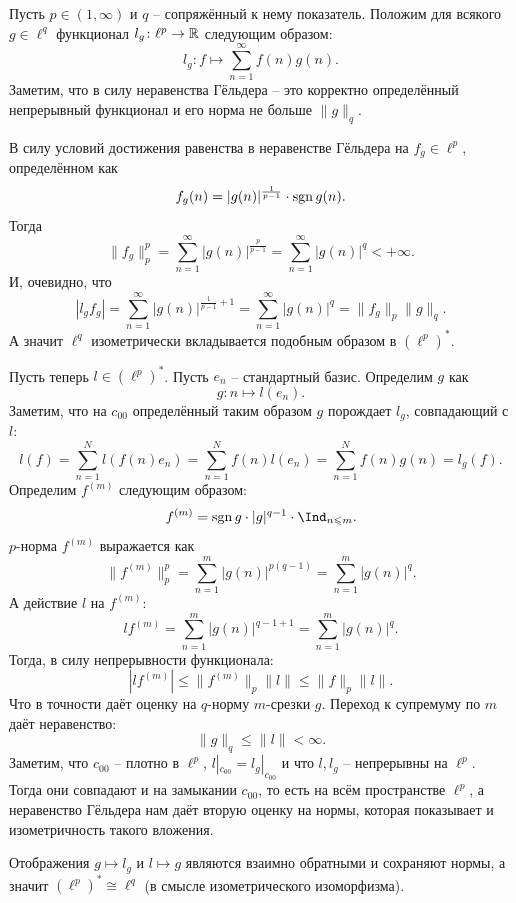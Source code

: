 \begin{solution}
    Пусть $p \in (1, \infty)$ и $q$ -- сопряжённый к нему показатель.
    Положим для всякого $g \in \ell^q$ функционал $l_g\colon \ell^p \to \mathbb{R}$ следующим образом:
    \[
        l_g\colon f \mapsto \sum_{n = 1}^{\infty} f(n)g(n).
    \]
    Заметим, что в силу неравенства Гёльдера -- это корректно определённый непрерывный функционал и его норма не больше $\|g\|_q$.

    В силу условий достижения равенства в неравенстве Гёльдера на $f_g \in \ell^p$, определённом как
    \[
        f_g(n) = |g(n)|^{\frac{1}{p - 1}} \cdot \operatorname{sgn} g(n).
    \]
    Тогда
    \[
        \|f_g\|_p^p = \sum_{n = 1}^{\infty} |g(n)|^{\frac{p}{p - 1}} = \sum_{n = 1}^{\infty} |g(n)|^{q} < +\infty.
    \]
    И, очевидно, что
    \[
        |l_g f_g| = \sum_{n = 1}^{\infty} |g(n)|^{\frac{1}{p - 1} + 1} = \sum_{n = 1}^{\infty} |g(n)|^{q} = \|f_g\|_p \|g\|_q.
    \]
    А значит $\ell^q$ изометрически вкладывается подобным образом в $(\ell^p)^*$.

    Пусть теперь $l \in (\ell^p)^*$.
    Пусть $e_n$ -- стандартный базис.
    Определим $g$ как
    \[
        g\colon n \mapsto l(e_n).
    \]
    Заметим, что на $c_{00}$ определённый таким образом $g$ порождает $l_g$, совпадающий с $l\colon$
    \[
        l(f) = \sum_{n = 1}^{N} l(f(n)e_n) = \sum_{n = 1}^{N} f(n)l(e_n) = \sum_{n = 1}^{N} f(n)g(n) = l_g(f).
    \]
    Определим $f^{(m)}$ следующим образом:
    \[
        f^{(m)} = \sgn g \cdot |g|^{q - 1} \cdot \Ind_{n \leq m}.
    \]
    $p$-норма $f^{(m)}$ выражается как
    \[
        \|f^{(m)}\|_p^p = \sum_{n = 1}^{m} |g(n)|^{p(q - 1)} = \sum_{n = 1}^{m} |g(n)|^{q}.
    \]
    А действие $l$ на $f^{(m)}\colon$
    \[
        l f^{(m)} = \sum_{n = 1}^{m} |g(n)|^{q - 1 + 1} = \sum_{n = 1}^{m} |g(n)|^{q}.
    \]
    Тогда, в силу непрерывности функционала:
    \[
        |l f^{(m)}| \leq \|f^{(m)}\|_p \|l\| \leq \|f\|_p \|l\|.
    \]
    Что в точности даёт оценку на $q$-норму $m$-срезки $g$.
    Переход к супремуму по $m$ даёт неравенство:
    \[
        \|g\|_q \leq \|l\| < \infty.
    \]
    Заметим, что $c_{00}$ -- плотно в $\ell^p$, $l|_{c_{00}} = l_g|_{c_{00}}$ и что $l, l_g$ -- непрерывны на $\ell^p$.
    Тогда они совпадают и на замыкании $c_{00}$, то есть на всём пространстве $\ell^p$, а неравенство Гёльдера нам даёт вторую оценку на нормы, которая показывает и изометричность такого вложения.

    Отображения $g \mapsto l_g$ и $l \mapsto g$ являются взаимно обратными и сохраняют нормы, а значит $(\ell^p)^* \cong \ell^q$ (в смысле изометрического изоморфизма).


\end{solution}

